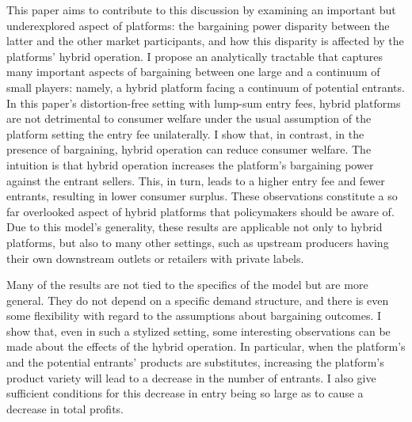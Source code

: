 This paper aims to contribute to this discussion by examining an important but underexplored aspect of platforms: the bargaining power disparity between the latter and the other market participants, and how this disparity is affected by the platforms' hybrid operation.
I propose an analytically tractable that captures many important aspects of bargaining between one large and a continuum of small players: namely, a hybrid platform facing a continuum of potential entrants.
In this paper's distortion-free setting with lump-sum entry fees, hybrid platforms are not detrimental to consumer welfare under the usual assumption of the platform setting the entry fee unilaterally.
I show that, in contrast, in the presence of bargaining, hybrid operation can reduce consumer welfare.
The intuition is that hybrid operation increases the platform's bargaining power against the entrant sellers.
This, in turn, leads to a higher entry fee and fewer entrants, resulting in lower consumer surplus.
These observations constitute a so far overlooked aspect of hybrid platforms that policymakers should be aware of.
Due to this model's generality, these results are applicable not only to hybrid platforms, but also to many other settings, such as upstream producers having their own downstream outlets or retailers with private labels.

Many of the results are not tied to the specifics of the model but are more general.
They do not depend on a specific demand structure, and there is even some flexibility with regard to the assumptions about bargaining outcomes.
I show that, even in such a stylized setting, some interesting observations can be made about the effects of the hybrid operation. 
In particular, when the platform's and the potential entrants' products are substitutes, increasing the platform's product variety will lead to a decrease in the number of entrants.
I also give sufficient conditions for this decrease in entry being so large as to cause a decrease in total profits.


